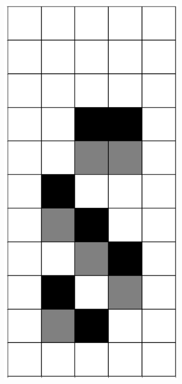 \documentclass[12pt]{article}
\numberwithin{figure}{section} %
\begin{document}
\begin{figure}[H]
\begin{subfigure}{0.3\textwidth}
     \includegraphics[angle=270,width=\linewidth]{Section4/4.0}
     \subcaption{}

\end{subfigure}
\end{figure}
\end{document}
